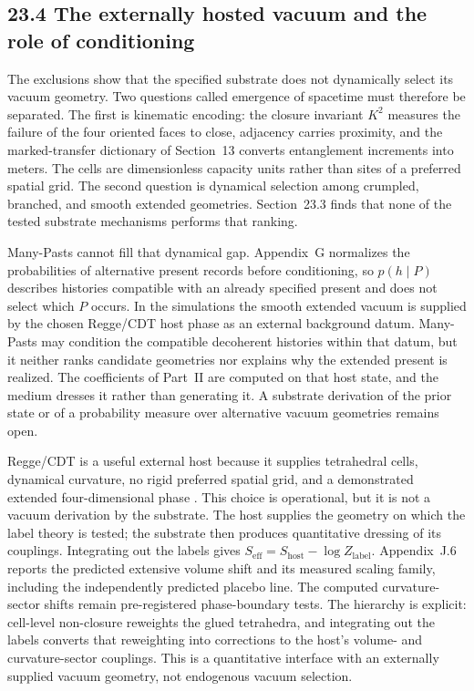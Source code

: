 \documentclass[11pt]{article}
\begin{document}
\subsection{23.4 The externally hosted vacuum and the role of conditioning}

The exclusions show that the specified substrate does not dynamically select its vacuum geometry. Two questions called emergence of spacetime must therefore be separated. The first is kinematic encoding: the closure invariant $K^2$ measures the failure of the four oriented faces to close, adjacency carries proximity, and the marked-transfer dictionary of Section~13 converts entanglement increments into meters. The cells are dimensionless capacity units rather than sites of a preferred spatial grid. The second question is dynamical selection among crumpled, branched, and smooth extended geometries. Section~23.3 finds that none of the tested substrate mechanisms performs that ranking.

Many-Pasts cannot fill that dynamical gap. Appendix~G normalizes the probabilities of alternative present records before conditioning, so $p(h\mid P)$ describes histories compatible with an already specified present and does not select which $P$ occurs. In the simulations the smooth extended vacuum is supplied by the chosen Regge/CDT host phase as an external background datum. Many-Pasts may condition the compatible decoherent histories within that datum, but it neither ranks candidate geometries nor explains why the extended present is realized. The coefficients of Part~II are computed on that host state, and the medium dresses it rather than generating it. A substrate derivation of the prior state or of a probability measure over alternative vacuum geometries remains open.

Regge/CDT is a useful external host because it supplies tetrahedral cells, dynamical curvature, no rigid preferred spatial grid, and a demonstrated extended four-dimensional phase \citep{AmbjornJurkiewiczLoll2004,AmbjornGJL2012}. This choice is operational, but it is not a vacuum derivation by the substrate. The host supplies the geometry on which the label theory is tested; the substrate then produces quantitative dressing of its couplings. Integrating out the labels gives $S_{\mathrm{eff}}=S_{\mathrm{host}}-\log Z_{\mathrm{label}}$. Appendix~J.6 reports the predicted extensive volume shift and its measured scaling family, including the independently predicted placebo line. The computed curvature-sector shifts remain pre-registered phase-boundary tests. The hierarchy is explicit: cell-level non-closure reweights the glued tetrahedra, and integrating out the labels converts that reweighting into corrections to the host's volume- and curvature-sector couplings. This is a quantitative interface with an externally supplied vacuum geometry, not endogenous vacuum selection.
\end{document}
